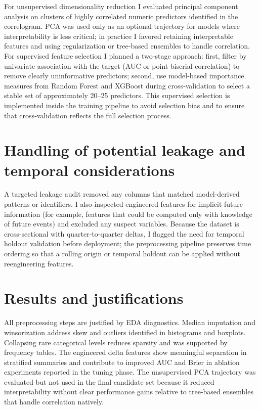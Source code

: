 \documentclass[
  12pt,
]{article}
\begin{document}
For unsupervised dimensionality reduction I evaluated principal
component analysis on clusters of highly correlated numeric predictors
identified in the correlogram. PCA was used only as an optional
trajectory for models where interpretability is less critical; in
practice I favored retaining interpretable features and using
regularization or tree‑based ensembles to handle correlation. For
supervised feature selection I planned a two‑stage approach: first,
filter by univariate association with the target (AUC or point‑biserial
correlation) to remove clearly uninformative predictors; second, use
model‑based importance measures from Random Forest and XGBoost during
cross‑validation to select a stable set of approximately 20--25
predictors. This supervised selection is implemented inside the training
pipeline to avoid selection bias and to ensure that cross‑validation
reflects the full selection process.

\section{Handling of potential leakage and temporal
considerations}\label{handling-of-potential-leakage-and-temporal-considerations}

A targeted leakage audit removed any columns that matched model‑derived
patterns or identifiers. I also inspected engineered features for
implicit future information (for example, features that could be
computed only with knowledge of future events) and excluded any suspect
variables. Because the dataset is cross‑sectional with
quarter‑to‑quarter deltas, I flagged the need for temporal holdout
validation before deployment; the preprocessing pipeline preserves time
ordering so that a rolling origin or temporal holdout can be applied
without reengineering features.

\section{Results and justifications}\label{results-and-justifications}

All preprocessing steps are justified by EDA diagnostics. Median
imputation and winsorization address skew and outliers identified in
histograms and boxplots. Collapsing rare categorical levels reduces
sparsity and was supported by frequency tables. The engineered delta
features show meaningful separation in stratified summaries and
contribute to improved AUC and Brier in ablation experiments reported in
the tuning phase. The unsupervised PCA trajectory was evaluated but not
used in the final candidate set because it reduced interpretability
without clear performance gains relative to tree‑based ensembles that
handle correlation natively.
\end{document}
